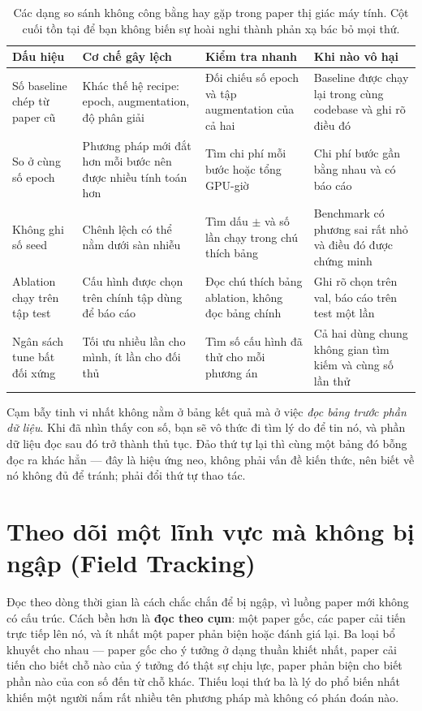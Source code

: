 \documentclass[../../deep_learning.tex]{subfiles}
\begin{document}
\begin{table}[H]\centering\footnotesize
\caption{Các dạng so sánh không công bằng hay gặp trong paper thị giác máy tính. Cột cuối tồn tại để bạn không biến sự hoài nghi thành phản xạ bác bỏ mọi thứ.}
\label{tab:so-sanh-lech}
\begin{tabularx}{\linewidth}{@{}L{2.5cm}YYL{3.2cm}@{}}
\toprule
\textbf{Dấu hiệu} & \textbf{Cơ chế gây lệch} & \textbf{Kiểm tra nhanh} & \textbf{Khi nào vô hại}\\
\midrule
Số baseline chép từ paper cũ & Khác thế hệ recipe: epoch, augmentation, độ phân giải & Đối chiếu số epoch và tập augmentation của cả hai & Baseline được chạy lại trong cùng codebase và ghi rõ điều đó\\
So ở cùng số epoch & Phương pháp mới đắt hơn mỗi bước nên được nhiều tính toán hơn & Tìm chi phí mỗi bước hoặc tổng GPU-giờ & Chi phí bước gần bằng nhau và có báo cáo\\
Không ghi số seed & Chênh lệch có thể nằm dưới sàn nhiễu & Tìm dấu \(\pm\) và số lần chạy trong chú thích bảng & Benchmark có phương sai rất nhỏ và điều đó được chứng minh\\
Ablation chạy trên tập test & Cấu hình được chọn trên chính tập dùng để báo cáo & Đọc chú thích bảng ablation, không đọc bảng chính & Ghi rõ chọn trên val, báo cáo trên test một lần\\
Ngân sách tune bất đối xứng & Tối ưu nhiều lần cho mình, ít lần cho đối thủ & Tìm số cấu hình đã thử cho mỗi phương án & Cả hai dùng chung không gian tìm kiếm và cùng số lần thử\\
\bottomrule
\end{tabularx}
\end{table}

\begin{cambay}
Cạm bẫy tinh vi nhất không nằm ở bảng kết quả mà ở việc \emph{đọc bảng trước phần dữ liệu}. Khi đã nhìn thấy con số, bạn sẽ vô thức đi tìm lý do để tin nó, và phần dữ liệu đọc sau đó trở thành thủ tục. Đảo thứ tự lại thì cùng một bảng đó bỗng đọc ra khác hẳn — đây là hiệu ứng neo, không phải vấn đề kiến thức, nên biết về nó không đủ để tránh; phải đổi thứ tự thao tác.
\end{cambay}

\section{Theo dõi một lĩnh vực mà không bị ngập (Field Tracking)}
Đọc theo dòng thời gian là cách chắc chắn để bị ngập, vì luồng paper mới không có cấu trúc. Cách bền hơn là \textbf{đọc theo cụm}: một paper gốc, các paper cải tiến trực tiếp lên nó, và ít nhất một paper phản biện hoặc đánh giá lại. Ba loại bổ khuyết cho nhau — paper gốc cho ý tưởng ở dạng thuần khiết nhất, paper cải tiến cho biết chỗ nào của ý tưởng đó thật sự chịu lực, paper phản biện cho biết phần nào của con số đến từ chỗ khác. Thiếu loại thứ ba là lý do phổ biến nhất khiến một người nắm rất nhiều tên phương pháp mà không có phán đoán nào.
\end{document}
